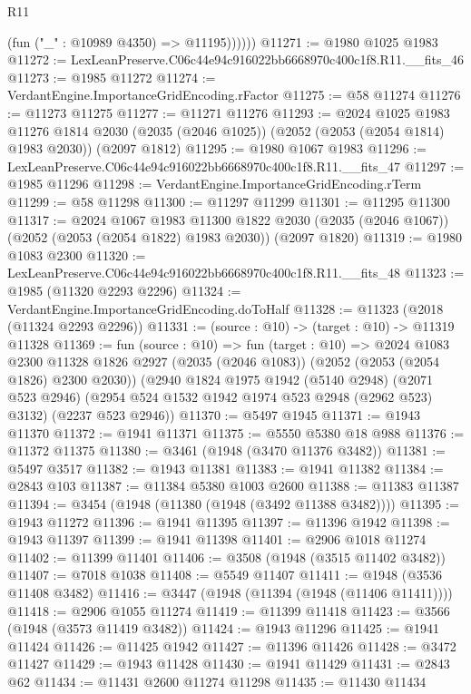 \begin{lexlean}{R11}
\begin{coremodule}
              (fun ("_" : @10989 @4350) => @11195))))))
@11271 := @1980 @1025 @1983
@11272 := LexLeanPreserve.C06c44e94c916022bb6668970c400c1f8.R11.__fits_46
@11273 := @1985 @11272
@11274 := VerdantEngine.ImportanceGridEncoding.rFactor
@11275 := @58 @11274
@11276 := @11273 @11275
@11277 := @11271 @11276
@11293 := @2024
    @1025
    @1983
    @11276
    @1814
    @2030
    (@2035 (@2046 @1025))
    (@2052 (@2053 (@2054 @1814) @1983 @2030))
    (@2097 @1812)
@11295 := @1980 @1067 @1983
@11296 := LexLeanPreserve.C06c44e94c916022bb6668970c400c1f8.R11.__fits_47
@11297 := @1985 @11296
@11298 := VerdantEngine.ImportanceGridEncoding.rTerm
@11299 := @58 @11298
@11300 := @11297 @11299
@11301 := @11295 @11300
@11317 := @2024
    @1067
    @1983
    @11300
    @1822
    @2030
    (@2035 (@2046 @1067))
    (@2052 (@2053 (@2054 @1822) @1983 @2030))
    (@2097 @1820)
@11319 := @1980 @1083 @2300
@11320 := LexLeanPreserve.C06c44e94c916022bb6668970c400c1f8.R11.__fits_48
@11323 := @1985 (@11320 @2293 @2296)
@11324 := VerdantEngine.ImportanceGridEncoding.doToHalf
@11328 := @11323 (@2018 (@11324 @2293 @2296))
@11331 := (source : @10) -> (target : @10) -> @11319 @11328
@11369 := fun (source : @10) =>
  fun (target : @10) =>
  @2024
    @1083
    @2300
    @11328
    @1826
    @2927
    (@2035 (@2046 @1083))
    (@2052 (@2053 (@2054 @1826) @2300 @2030))
    (@2940
      @1824
      @1975
      @1942
      (@5140 @2948)
      (@2071 @523 @2946)
      (@2954 @524 @1532 @1942 @1974 @523 @2948 (@2962 @523) @3132)
      (@2237 @523 @2946))
@11370 := @5497 @1945
@11371 := @1943 @11370
@11372 := @1941 @11371
@11375 := @5550 @5380 @18 @988
@11376 := @11372 @11375
@11380 := @3461 (@1948 (@3470 @11376 @3482))
@11381 := @5497 @3517
@11382 := @1943 @11381
@11383 := @1941 @11382
@11384 := @2843 @103
@11387 := @11384 @5380 @1003 @2600
@11388 := @11383 @11387
@11394 := @3454 (@1948 (@11380 (@1948 (@3492 @11388 @3482))))
@11395 := @1943 @11272
@11396 := @1941 @11395
@11397 := @11396 @1942
@11398 := @1943 @11397
@11399 := @1941 @11398
@11401 := @2906 @1018 @11274
@11402 := @11399 @11401
@11406 := @3508 (@1948 (@3515 @11402 @3482))
@11407 := @7018 @1038
@11408 := @5549 @11407
@11411 := @1948 (@3536 @11408 @3482)
@11416 := @3447 (@1948 (@11394 (@1948 (@11406 @11411))))
@11418 := @2906 @1055 @11274
@11419 := @11399 @11418
@11423 := @3566 (@1948 (@3573 @11419 @3482))
@11424 := @1943 @11296
@11425 := @1941 @11424
@11426 := @11425 @1942
@11427 := @11396 @11426
@11428 := @3472 @11427
@11429 := @1943 @11428
@11430 := @1941 @11429
@11431 := @2843 @62
@11434 := @11431 @2600 @11274 @11298
@11435 := @11430 @11434

\end{coremodule}
\end{lexlean}
